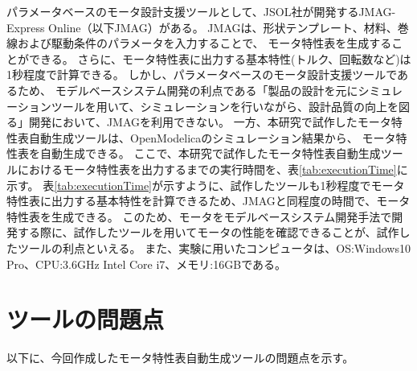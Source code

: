 パラメータベースのモータ設計支援ツールとして、JSOL社が開発するJMAG-Express Online（以下JMAG）がある\cite{jmag}。
JMAGは、形状テンプレート、材料、巻線および駆動条件のパラメータを入力することで、
モータ特性表を生成することができる。
さらに、モータ特性表に出力する基本特性(トルク、回転数など)は1秒程度で計算できる。
しかし、パラメータベースのモータ設計支援ツールであるため、
モデルベースシステム開発の利点である「製品の設計を元にシミュレーションツールを用いて、シミュレーションを行いながら、設計品質の向上を図る」開発において、JMAGを利用できない。
一方、本研究で試作したモータ特性表自動生成ツールは、OpenModelicaのシミュレーション結果から、
モータ特性表を自動生成できる。
ここで、本研究で試作したモータ特性表自動生成ツールにおけるモータ特性表を出力するまでの実行時間を、表\ref{tab:executionTime}に示す。
表\ref{tab:executionTime}が示すように、試作したツールも1秒程度でモータ特性表に出力する基本特性を計算できるため、JMAGと同程度の時間で、モータ特性表を生成できる。
このため、モータをモデルベースシステム開発手法で開発する際に、試作したツールを用いてモータの性能を確認できることが、試作したツールの利点といえる。
また、実験に用いたコンピュータは、OS:Windows10 Pro、CPU:3.6GHz Intel Core i7、メモリ:16GBである。

\section{ツールの問題点}

以下に、今回作成したモータ特性表自動生成ツールの問題点を示す。

